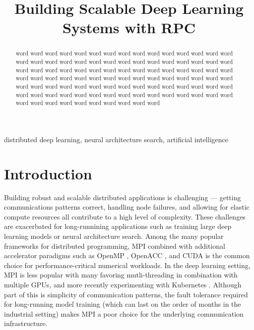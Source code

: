 \documentclass[conference]{IEEEtran}
\begin{document}
\title{Building Scalable Deep Learning Systems with RPC}

\author{
\and
{}
}

\maketitle

\begin{abstract}
  word word word word word word word word word word
  word word word word word word word word word word
  word word word word word word word word word word
  word word word word word word word word word word
  word word word word word word word word word word
  word word word word word word word word word word
  word word word word word word word word word word
  word word word word word word word word word word
  word word word word word word word word word word
  word word word word word word word word word word
\end{abstract}

\begin{IEEEkeywords}
distributed deep learning, neural architecture search, artificial intelligence
\end{IEEEkeywords}

\section{Introduction}
Building robust and scalable distributed applications is challenging --- getting
communications patterns correct, handling node failures, and allowing for
elastic compute resources all contribute to a high level of complexity. These
challenges are exacerbated for long-runnining applications such as training
large deep learning models or neural architecture search. Among the many popular
frameworks for distributed programming, MPI \cite{Forum:1994:MMI:898758}
combined with additional accelerator paradigms such as OpenMP
\cite{Dagum:1998:OIA:615255.615542}, OpenACC
\cite{Wienke:2012:OFE:2402420.2402522}, and CUDA
\cite{Nickolls:2008:SPP:1365490.1365500} is the common choice for
performance-critical numerical workloads. In the deep learning setting, MPI is
less popular with many favoring mutli-threading in combination with multiple
GPUs, and more recently experimenting with Kubernetes \cite{8094194,
  8672301}. Although part of this is simplicity of communication patterns, the
fault tolerance required for long-running model training (which can last on the
order of months in the industrial setting) makes MPI a poor choice for the
underlying communication infrastructure.
\end{document}
